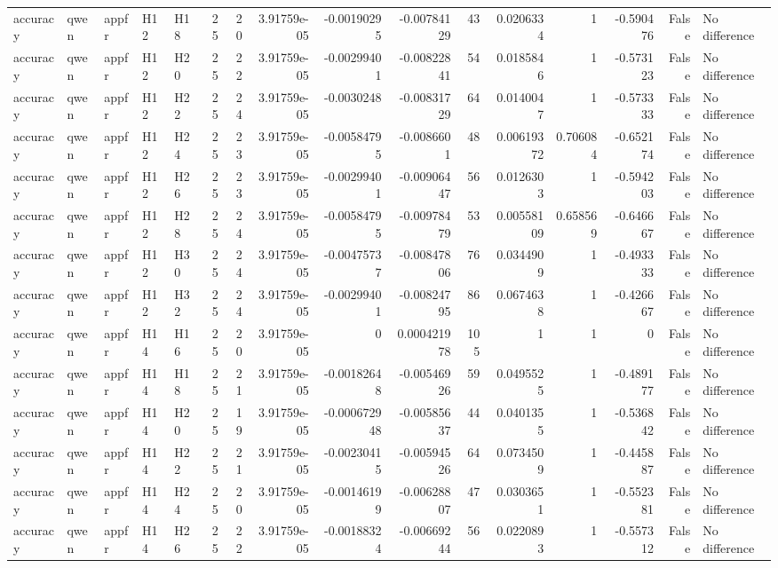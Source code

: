 \begin{longtable}{lllllrrrrrrrrrrl}
accuracy & qwen & appfr & H12 & H18 & 25 & 20 & 3.91759e-05 & -0.00190295 & -0.00784129 & 43 & 0.0206334 & 1 & -0.590476 & False & No difference \\
accuracy & qwen & appfr & H12 & H20 & 25 & 22 & 3.91759e-05 & -0.00299401 & -0.00822841 & 54 & 0.0185846 & 1 & -0.573123 & False & No difference \\
accuracy & qwen & appfr & H12 & H22 & 25 & 24 & 3.91759e-05 & -0.0030248 & -0.00831729 & 64 & 0.0140047 & 1 & -0.573333 & False & No difference \\
accuracy & qwen & appfr & H12 & H24 & 25 & 23 & 3.91759e-05 & -0.00584795 & -0.0086601 & 48 & 0.00619372 & 0.706084 & -0.652174 & False & No difference \\
accuracy & qwen & appfr & H12 & H26 & 25 & 23 & 3.91759e-05 & -0.00299401 & -0.00906447 & 56 & 0.0126303 & 1 & -0.594203 & False & No difference \\
accuracy & qwen & appfr & H12 & H28 & 25 & 24 & 3.91759e-05 & -0.00584795 & -0.00978479 & 53 & 0.00558109 & 0.658569 & -0.646667 & False & No difference \\
accuracy & qwen & appfr & H12 & H30 & 25 & 24 & 3.91759e-05 & -0.00475737 & -0.00847806 & 76 & 0.0344909 & 1 & -0.493333 & False & No difference \\
accuracy & qwen & appfr & H12 & H32 & 25 & 24 & 3.91759e-05 & -0.00299401 & -0.00824795 & 86 & 0.0674638 & 1 & -0.426667 & False & No difference \\
accuracy & qwen & appfr & H14 & H16 & 25 & 20 & 3.91759e-05 & 0 & 0.000421978 & 105 & 1 & 1 & 0 & False & No difference \\
accuracy & qwen & appfr & H14 & H18 & 25 & 21 & 3.91759e-05 & -0.00182648 & -0.00546926 & 59 & 0.0495525 & 1 & -0.489177 & False & No difference \\
accuracy & qwen & appfr & H14 & H20 & 25 & 19 & 3.91759e-05 & -0.000672948 & -0.00585637 & 44 & 0.0401355 & 1 & -0.536842 & False & No difference \\
accuracy & qwen & appfr & H14 & H22 & 25 & 21 & 3.91759e-05 & -0.00230415 & -0.00594526 & 64 & 0.0734509 & 1 & -0.445887 & False & No difference \\
accuracy & qwen & appfr & H14 & H24 & 25 & 20 & 3.91759e-05 & -0.00146199 & -0.00628807 & 47 & 0.0303651 & 1 & -0.552381 & False & No difference \\
accuracy & qwen & appfr & H14 & H26 & 25 & 22 & 3.91759e-05 & -0.00188324 & -0.00669244 & 56 & 0.0220893 & 1 & -0.557312 & False & No difference \\

\end{longtable}
